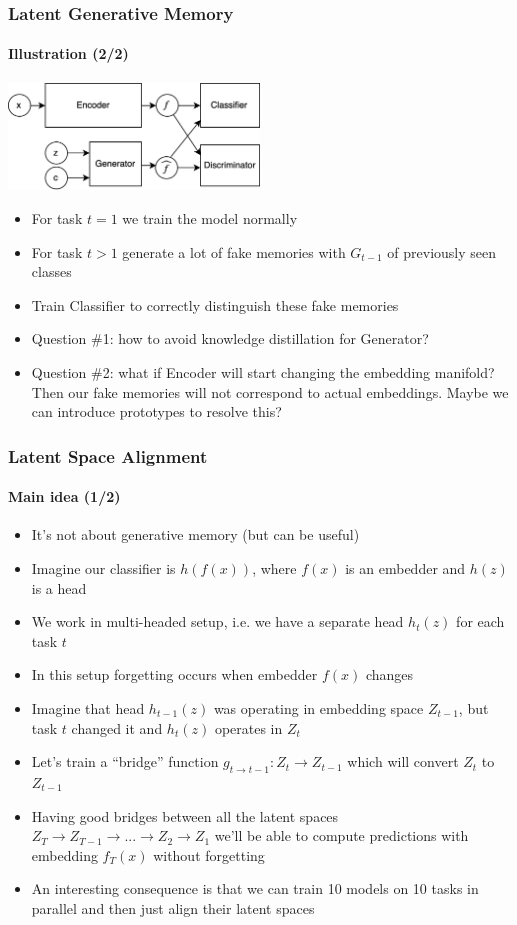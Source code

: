 \documentclass[10pt]{beamer}
\begin{document}
\begin{frame}
    \frametitle{Latent Generative Memory}
    \framesubtitle{Illustration (2/2)}

    \centering
    \includegraphics[width=0.5\textwidth]{images/latent-genmem}
    
    \begin{itemize}
        \item For task $t=1$ we train the model normally
        \item For task $t > 1$ generate a lot of fake memories with $G_{t-1}$ of previously seen classes
        \item Train Classifier to correctly distinguish these fake memories
        \item Question \#1: how to avoid knowledge distillation for Generator?
        \item Question \#2: what if Encoder will start changing the embedding manifold? Then our fake memories will not correspond to actual embeddings. Maybe we can introduce prototypes to resolve this?
    \end{itemize}
\end{frame}

\begin{frame}
    \frametitle{Latent Space Alignment}
    \framesubtitle{Main idea (1/2)}
    
    \begin{itemize}
        \item It's not about generative memory (but can be useful)
        \item Imagine our classifier is $h(f(x))$, where $f(x)$ is an embedder and $h(z)$ is a head
        \item We work in multi-headed setup, i.e. we have a separate head $h_t(z)$ for each task $t$
        \item In this setup forgetting occurs when embedder $f(x)$ changes
        \item Imagine that head $h_{t-1}(z)$ was operating in embedding space $Z_{t-1}$, but task $t$ changed it and $h_t(z)$ operates in $Z_t$
        \item Let's train a ``bridge'' function $g_{t \to t-1}:Z_t \to Z_{t-1}$ which will convert $Z_t$ to $Z_{t-1}$
        \item Having good bridges between all the latent spaces $Z_T \to Z_{T-1} \to ... \to Z_2 \to Z_1$ we'll be able to compute predictions with embedding $f_T(x)$ without forgetting
        \item An interesting consequence is that we can train 10 models on 10 tasks in parallel and then just align their latent spaces
    \end{itemize}
\end{frame}
\end{document}
